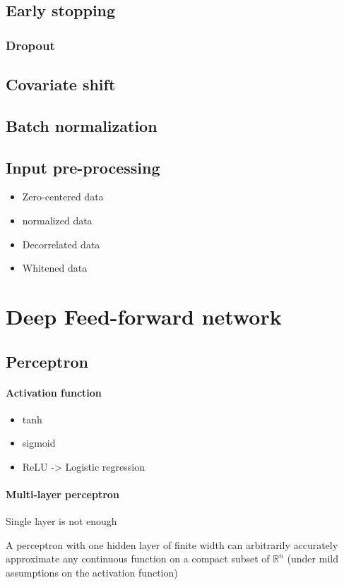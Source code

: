 	\subsection{Early stopping}

	\subsubsection*{Dropout}

	\subsection{Covariate shift}

	\subsection{Batch normalization}

	\subsection{Input pre-processing}
		\begin{itemize}
			\item Zero-centered data
			\item normalized data
			\item Decorrelated data
			\item Whitened data
		\end{itemize}
\section{Deep Feed-forward network}
	\subsection{Perceptron}
		\paragraph*{Activation function}
			\begin{itemize}
				\item tanh
				\item sigmoid
				\item ReLU -> Logistic regression
		\end{itemize}

		\paragraph*{Multi-layer perceptron}
			Single layer is not enough
			\begin{theorem}
				A perceptron with one hidden layer of finite width can arbitrarily accurately approximate any continuous function on a compact
				subset of $\mathbb{R}^n$ (under mild assumptions on the activation function)
			\end{theorem}


